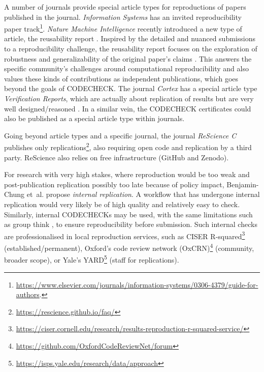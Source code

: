 \documentclass[12pt]{article}
\begin{document}
A number of journals provide special article types for reproductions of papers
published in the journal.
\emph{Information Systems} has an invited 
reproducibility paper track\footnote{
\url{https://www.elsevier.com/journals/information-systems/0306-4379/guide-for-authors}.}.
\emph{Nature Machine Intelligence} recently introduced a new type of article,
the reusability report \cite{noauthor_research_2020}.
Inspired by the detailed and nuanced submissions to a reproducibility 
challenge, the reusability report focuses on the exploration of robustness
and generalizability of the original paper's claims
\cite{noauthor_research_2020}. This answers the specific community's 
challenges around computational reproducibility and also values these kinds
of contributions as independent publications, which goes beyond the goals 
of CODECHECK.
The journal \emph{Cortex} has a special article type 
\emph{Verification Reports}, which are actually about replication of results
but are very well designed/reasoned \cite{chambers_verification_2020}.
In a similar vein, the CODECHECK certificates
could also be published as a special article type within journals.

Going beyond article types and a specific journal, the journal \emph{ReScience C} publishes only
replications\footnote{\url{https://rescience.github.io/faq/}}, also requiring
open code and replication by a third party. ReScience also relies on
free infrastructure (GitHub and Zenodo).

For research with very high stakes, where reproduction would be too weak and
post-publication replication possibly too late because of policy impact,
Benjamin-Chung et~al. \cite{benjamin-chung_internal_2020} propose
\emph{internal replication}.
A workflow that has undergone internal
replication would very likely be of high quality and relatively easy to check.
Similarly, internal CODECHECKs may be used, with the same limitations such
as group think \cite{benjamin-chung_internal_2020},
to ensure reproducibility before submission.
Such internal checks are professionalised in local reproduction services,
such as CISER R-squared\footnote{
\url{https://ciser.cornell.edu/research/results-reproduction-r-squared-service/}} (established/permanent),
Oxford's code review network (OxCRN)\footnote{
\url{https://github.com/OxfordCodeReviewNet/forum}} (community, broader scope), or
Yale's YARD\footnote{
\url{https://isps.yale.edu/research/data/approach}} (staff for replications).
\end{document}
